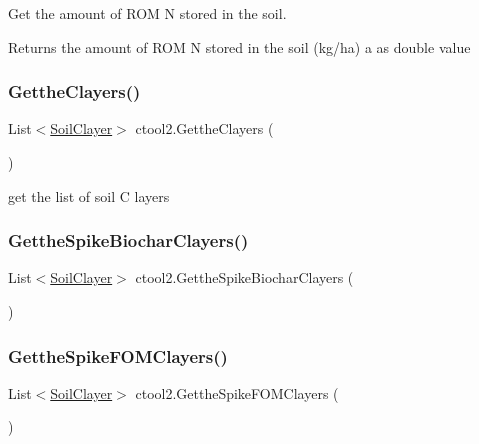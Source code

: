 Get the amount of R\+OM N stored in the soil. 

\begin{DoxyReturn}{Returns}
the amount of R\+OM N stored in the soil (kg/ha) a as double value 
\end{DoxyReturn}
\mbox{\label{classctool2_a5a57b763bb7173f222b26f26f08102c0}} 
\subsubsection{\texorpdfstring{GettheClayers()}{GettheClayers()}}
{\footnotesize\ttfamily List$<$\mbox{\hyperlink{class_soil_clayer}{Soil\+Clayer}}$>$ ctool2.\+Getthe\+Clayers (\begin{DoxyParamCaption}{ }\end{DoxyParamCaption})\hspace{0.3cm}{\ttfamily [inline]}}



get the list of soil C layers 

\mbox{\label{classctool2_a4fd7ccfba014dfc2d72b273f1952f937}} 
\subsubsection{\texorpdfstring{GettheSpikeBiocharClayers()}{GettheSpikeBiocharClayers()}}
{\footnotesize\ttfamily List$<$\mbox{\hyperlink{class_soil_clayer}{Soil\+Clayer}}$>$ ctool2.\+Getthe\+Spike\+Biochar\+Clayers (\begin{DoxyParamCaption}{ }\end{DoxyParamCaption})\hspace{0.3cm}{\ttfamily [inline]}}

\mbox{\label{classctool2_a219e077b022c6df25d58e7ec0db1f52c}} 
\subsubsection{\texorpdfstring{GettheSpikeFOMClayers()}{GettheSpikeFOMClayers()}}
{\footnotesize\ttfamily List$<$\mbox{\hyperlink{class_soil_clayer}{Soil\+Clayer}}$>$ ctool2.\+Getthe\+Spike\+F\+O\+M\+Clayers (\begin{DoxyParamCaption}{ }\end{DoxyParamCaption})\hspace{0.3cm}{\ttfamily [inline]}}

